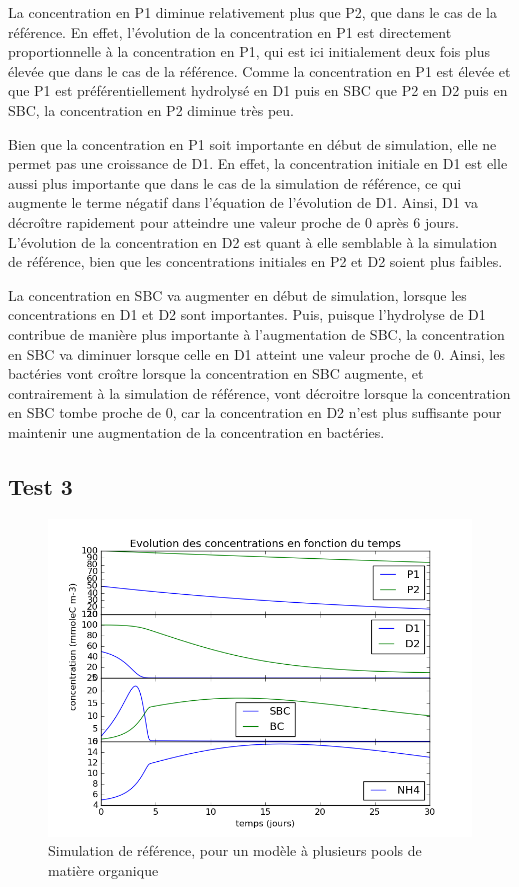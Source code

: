 \par{
La concentration en P1 diminue relativement plus que P2, que dans le cas de la r\'ef\'erence. En effet, l'\'evolution de la concentration en P1 est directement proportionnelle \`a la concentration en P1, qui est ici initialement deux fois plus \'elev\'ee que dans le cas de la r\'ef\'erence. Comme la concentration en P1 est \'elev\'ee et que P1 est pr\'ef\'erentiellement hydrolys\'e en D1 puis en SBC que P2 en D2 puis en SBC, la concentration en P2 diminue tr\`es peu.
}
\par{
Bien que la concentration en P1 soit importante en d\'ebut de simulation, elle ne permet pas une croissance de D1. En effet, la concentration initiale en D1 est elle aussi plus importante que dans le cas de la simulation de r\'ef\'erence, ce qui augmente le terme n\'egatif dans l'\'equation de l'\'evolution de D1. Ainsi, D1 va d\'ecro\^itre rapidement pour atteindre une valeur proche de 0 apr\`es 6 jours. L'\'evolution de la concentration en D2 est quant \`a elle semblable \`a la simulation de r\'ef\'erence, bien que les concentrations initiales en P2 et D2 soient plus faibles.
}
\par{
La concentration en SBC va augmenter en d\'ebut de simulation, lorsque les concentrations en D1 et D2 sont importantes. Puis, puisque l'hydrolyse de D1 contribue de mani\`ere plus importante \`a l'augmentation de SBC, la concentration en SBC va diminuer lorsque celle en D1 atteint une valeur proche de 0. Ainsi, les bact\'eries vont cro\^itre lorsque la concentration en SBC augmente, et contrairement \`a la simulation de r\'ef\'erence, vont d\'ecroitre lorsque la concentration en SBC tombe proche de 0, car la concentration en D2 n'est plus suffisante pour maintenir une augmentation de la concentration en bact\'eries.
}

\subsection{Test 3}

\begin{figure}[h!]
  \includegraphics[width=\textwidth]{partie2/Test3.png}
  \caption{Simulation de r\'ef\'erence, pour un mod\`ele \`a plusieurs pools de mati\`ere organique
  }
  \label{fig:partie2test3}
\end{figure}

